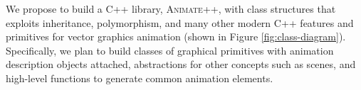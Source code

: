 \documentclass[10pt, nocopyrightspace, numbers]{assets/sigplanconf}
\begin{document}
We propose to build a C++ library, \textsc{Animate++}, with class structures that exploits inheritance, polymorphism, and many other modern C++ features and primitives for vector graphics animation (shown in Figure \ref{fig:class-diagram}). Specifically, we plan to build classes of graphical primitives with animation description objects attached, abstractions for other concepts such as scenes, and high-level functions to generate common animation elements.



\FloatBarrier %



\end{document}
